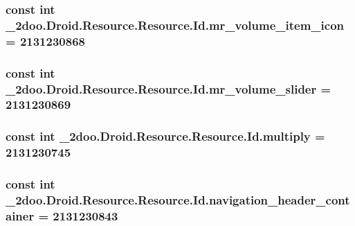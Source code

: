 \hypertarget{class__2doo_1_1_droid_1_1_resource_1_1_id_c8e13567db3929732089accc1779f912}{
\subsubsection[{mr\_\-volume\_\-item\_\-icon}]{\setlength{\rightskip}{0pt plus 5cm}const int \_\-2doo.Droid.Resource.Resource.Id.mr\_\-volume\_\-item\_\-icon = 2131230868}}
\label{class__2doo_1_1_droid_1_1_resource_1_1_id_c8e13567db3929732089accc1779f912}


\hypertarget{class__2doo_1_1_droid_1_1_resource_1_1_id_ac4c4f88512ba0ba1bb1bc7a065ac3d1}{
\subsubsection[{mr\_\-volume\_\-slider}]{\setlength{\rightskip}{0pt plus 5cm}const int \_\-2doo.Droid.Resource.Resource.Id.mr\_\-volume\_\-slider = 2131230869}}
\label{class__2doo_1_1_droid_1_1_resource_1_1_id_ac4c4f88512ba0ba1bb1bc7a065ac3d1}


\hypertarget{class__2doo_1_1_droid_1_1_resource_1_1_id_e058b3bf413d70561bf5f2636b08358b}{
\subsubsection[{multiply}]{\setlength{\rightskip}{0pt plus 5cm}const int \_\-2doo.Droid.Resource.Resource.Id.multiply = 2131230745}}
\label{class__2doo_1_1_droid_1_1_resource_1_1_id_e058b3bf413d70561bf5f2636b08358b}


\hypertarget{class__2doo_1_1_droid_1_1_resource_1_1_id_95ea48cee04b758f223b157ca4713e1b}{
\subsubsection[{navigation\_\-header\_\-container}]{\setlength{\rightskip}{0pt plus 5cm}const int \_\-2doo.Droid.Resource.Resource.Id.navigation\_\-header\_\-container = 2131230843}}
\label{class__2doo_1_1_droid_1_1_resource_1_1_id_95ea48cee04b758f223b157ca4713e1b}


